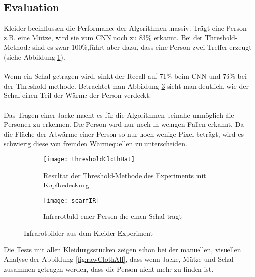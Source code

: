 \subsection{Evaluation}
Kleider beeinflussen die Performance der Algorithmen massiv. Trägt eine Person z.B. eine Mütze, wird sie vom \gls{CNN} noch zu 83\% erkannt. Bei der Threshold-Methode sind es zwar 100\%,führt aber dazu, dass eine Person zwei Treffer erzeugt (siehe Abbildung \ref{fig:thresholdClothHat}).\\
\\
Wenn ein Schal getragen wird, sinkt der Recall auf 71\% beim \gls{CNN} und 76\% bei der Threshold-methode. Betrachtet man Abbildung \ref{fig:scarfIR} sieht man deutlich, wie der Schal einen Teil der Wärme der Person verdeckt.\\
\\
Das Tragen einer Jacke macht es für die Algorithmen beinahe unmöglich die Personen zu erkennen. Die Person wird nur noch in wenigen Fällen erkannt. Da die Fläche der Abwärme einer Person so nur noch wenige Pixel beträgt, wird es schwierig diese von fremden Wärmequellen zu unterscheiden.\\

\begin{figure}[H]
	\centering
	\begin{subfigure}{.45\linewidth}
		\centering
		\texttt{[image: thresholdClothHat]}
		\caption{Resultat der Threshold-Methode des Experiments mit Kopfbedeckung}
		\label{fig:thresholdClothHat}
	\end{subfigure}\hfill%
	\begin{subfigure}{.45\linewidth}
		\centering
		\texttt{[image: scarfIR]}
		\caption{Infrarotbild einer Person die einen Schal trägt}
		\label{fig:scarfIR}
	\end{subfigure}\hfill%
	\caption{Infrarotbilder aus dem Kleider Experiment}
\end{figure}

\noindent
Die Tests mit allen Kleidungsstücken zeigen schon bei der manuellen, visuellen Analyse der Abbildung \ref{fig:rawClothAll}, dass wenn Jacke, Mütze und Schal zusammen getragen werden, dass die Person nicht mehr zu finden ist.

